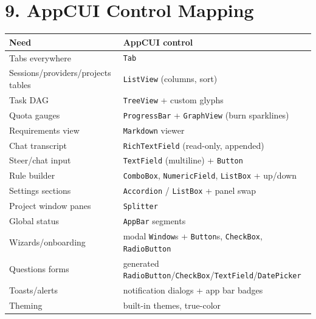 \documentclass[10pt,a4paper]{article}
\begin{document}
\section{9. AppCUI Control Mapping}
\begin{small}
\begin{tabularx}{\linewidth}{lX}
\toprule
Need & AppCUI control \\
\midrule
Tabs everywhere & \texttt{Tab} \\
Sessions/providers/projects tables & \texttt{ListView} (columns, sort) \\
Task DAG & \texttt{TreeView} + custom glyphs \\
Quota gauges & \texttt{ProgressBar} + \texttt{GraphView} (burn sparklines) \\
Requirements view & \texttt{Markdown} viewer \\
Chat transcript & \texttt{RichTextField} (read-only, appended) \\
Steer/chat input & \texttt{TextField} (multiline) + \texttt{Button} \\
Rule builder & \texttt{ComboBox}, \texttt{NumericField}, \texttt{ListBox} + up/down \\
Settings sections & \texttt{Accordion} / \texttt{ListBox} + panel swap \\
Project window panes & \texttt{Splitter} \\
Global status & \texttt{AppBar} segments \\
Wizards/onboarding & modal \texttt{Window}s + \texttt{Button}s, \texttt{CheckBox}, \texttt{RadioButton} \\
Questions forms & generated \texttt{RadioButton}/\texttt{CheckBox}/\texttt{TextField}/\texttt{DatePicker} \\
Toasts/alerts & notification dialogs + app bar badges \\
Theming & built-in themes, true-color \\
\bottomrule
\end{tabularx}
\end{small}
\end{document}
